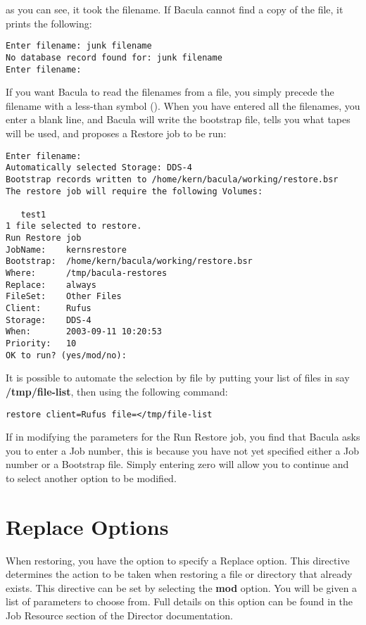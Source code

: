 as you can see, it took the filename. If Bacula cannot find a copy of the
file, it prints the following: 

\footnotesize
\begin{verbatim}
Enter filename: junk filename
No database record found for: junk filename
Enter filename:
\end{verbatim}
\normalsize

If you want Bacula to read the filenames from a file, you simply precede the
filename with a less-than symbol (\lt{}). When you have entered all the
filenames, you enter a blank line, and Bacula will write the bootstrap file,
tells you what tapes will be used, and proposes a Restore job to be run: 

\footnotesize
\begin{verbatim}
Enter filename:
Automatically selected Storage: DDS-4
Bootstrap records written to /home/kern/bacula/working/restore.bsr
The restore job will require the following Volumes:
   
   test1
1 file selected to restore.
Run Restore job
JobName:    kernsrestore
Bootstrap:  /home/kern/bacula/working/restore.bsr
Where:      /tmp/bacula-restores
Replace:    always
FileSet:    Other Files
Client:     Rufus
Storage:    DDS-4
When:       2003-09-11 10:20:53
Priority:   10
OK to run? (yes/mod/no):
\end{verbatim}
\normalsize

It is possible to automate the selection by file by putting your list of files
in say {\bf /tmp/file-list}, then using the following command: 

\footnotesize
\begin{verbatim}
restore client=Rufus file=</tmp/file-list
\end{verbatim}
\normalsize

If in modifying the parameters for the Run Restore job, you find that Bacula
asks you to enter a Job number, this is because you have not yet specified
either a Job number or a Bootstrap file. Simply entering zero will allow you
to continue and to select another option to be modified. 

\label{Replace}

\section{Replace Options}

When restoring, you have the option to specify a Replace option.  This 
directive determines the action to be taken when restoring a file or 
directory that already exists.  This directive can be set by selecting 
the {\bf mod} option.  You will be given a list of parameters to choose
from.  Full details on this option can be found in the Job Resource section
of the Director documentation.

